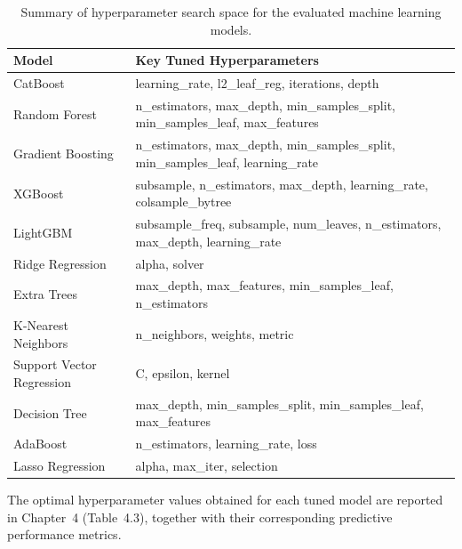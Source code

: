 \begin{table}[H]
\centering
\renewcommand{\arraystretch}{1.2}
\begin{tabular}{|p{4cm}|p{10.5cm}|}
\hline
\textbf{Model} & \textbf{Key Tuned Hyperparameters} \\ \hline

CatBoost &
learning\_rate, l2\_leaf\_reg, iterations, depth \\ \hline

Random Forest &
n\_estimators, max\_depth, min\_samples\_split, min\_samples\_leaf, max\_features \\ \hline

Gradient Boosting &
n\_estimators, max\_depth, min\_samples\_split, min\_samples\_leaf, learning\_rate \\ \hline

XGBoost &
subsample, n\_estimators, max\_depth, learning\_rate, colsample\_bytree \\ \hline

LightGBM &
subsample\_freq, subsample, num\_leaves, n\_estimators, max\_depth, learning\_rate \\ \hline

Ridge Regression &
alpha, solver \\ \hline

Extra Trees &
max\_depth, max\_features, min\_samples\_leaf, n\_estimators \\ \hline

K-Nearest Neighbors &
n\_neighbors, weights, metric \\ \hline

Support Vector Regression &
C, epsilon, kernel \\ \hline

Decision Tree &
max\_depth, min\_samples\_split, min\_samples\_leaf, max\_features \\ \hline

AdaBoost &
n\_estimators, learning\_rate, loss \\ \hline

Lasso Regression &
alpha, max\_iter, selection \\ \hline

\end{tabular}
\caption{Summary of hyperparameter search space for the evaluated machine learning models.}
\label{tab:hyperparameter_space}
\end{table}

The optimal hyperparameter values obtained for each tuned model are reported in Chapter~4 (Table~4.3), together with their corresponding predictive performance metrics.


